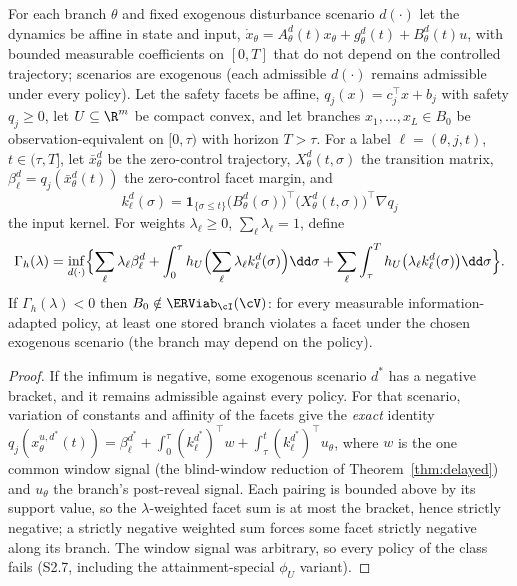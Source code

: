 \begin{proposition}\label{prop:recourse}
For each branch $\theta$ and fixed exogenous disturbance scenario $d(\cdot)$ let the dynamics be affine in state and input, $\dot x_\theta=A^d_\theta(t)x_\theta+g^d_\theta(t)+B^d_\theta(t)u$, with bounded measurable coefficients on $[0,T]$ that do not depend on the controlled trajectory; scenarios are exogenous (each admissible $d(\cdot)$ remains admissible under every policy). Let the safety facets be affine, $q_j(x)=c_j^\top x+b_j$ with safety $q_j\ge0$, let $U\subseteq\R^m$ be compact convex, and let branches $x_1,\dots,x_L\in B_0$ be observation-equivalent on $[0,\tau)$ with horizon $T>\tau$. For a label $\ell=(\theta,j,t)$, $t\in(\tau,T]$, let $\bar x^d_\theta$ be the zero-control trajectory, $X^d_\theta(t,\sigma)$ the transition matrix, $\beta^d_\ell=q_j(\bar x^d_\theta(t))$ the zero-control facet margin, and
\[
k^d_\ell(\sigma)=\mathbf 1_{\{\sigma\le t\}}\bigl(B^d_{\theta}(\sigma)\bigr)^\top\bigl(X^d_\theta(t,\sigma)\bigr)^\top\nabla q_j
\]
the input kernel. For weights $\lambda_\ell\ge0$, $\sum_\ell\lambda_\ell=1$, define
\begin{equation}\label{eq:gamma}
\Gamma_h(\lambda)=\inf_{d(\cdot)}\Bigl\{\sum_\ell\lambda_\ell\beta^d_\ell+\int_0^\tau h_U\Bigl(\sum_\ell\lambda_\ell k^d_\ell(\sigma)\Bigr)\dd\sigma+\sum_\ell\int_\tau^Th_U\bigl(\lambda_\ell k^d_\ell(\sigma)\bigr)\dd\sigma\Bigr\}.
\end{equation}
If $\Gamma_h(\lambda)<0$ then $B_0\notin\ERViab_\cI(\cV)$: for every measurable information-adapted policy, at least one stored branch violates a facet under the chosen exogenous scenario (the branch may depend on the policy).
\end{proposition}

\begin{proof}
If the infimum is negative, some exogenous scenario $d^*$ has a negative bracket, and it remains admissible against every policy. For that scenario, variation of constants and affinity of the facets give the \emph{exact} identity $q_j(x^{u,d^*}_\theta(t))=\beta^{d^*}_\ell+\int_0^\tau(k^{d^*}_\ell)^\top w+\int_\tau^t(k^{d^*}_\ell)^\top u_\theta$, where $w$ is the one common window signal (the blind-window reduction of Theorem~\ref{thm:delayed}) and $u_\theta$ the branch's post-reveal signal. Each pairing is bounded above by its support value, so the $\lambda$-weighted facet sum is at most the bracket, hence strictly negative; a strictly negative weighted sum forces some facet strictly negative along its branch. The window signal was arbitrary, so every policy of the class fails (S2.7, including the attainment-special $\phi_U$ variant).
\end{proof}

